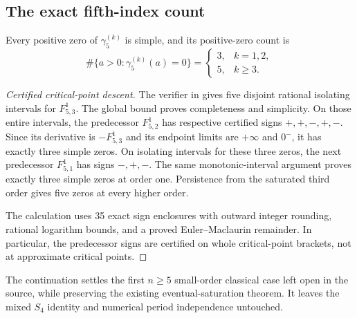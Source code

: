 \subsection{The exact fifth-index count}
\begin{theorem}\label{lerchcont:n5}
Every positive zero of $\gamma_5^{(k)}$ is simple, and its positive-zero count is
\[
 \#\{a>0:\gamma_5^{(k)}(a)=0\}=
 \begin{cases}3,&k=1,2,\\5,&k\ge3.\end{cases}
\]
\end{theorem}
\begin{proof}[Certified critical-point descent]
The verifier in \cite{lerchcont2026} gives five disjoint rational isolating
intervals for $F_{5,3}^{1}$. The global bound proves completeness and simplicity.
On those entire intervals, the predecessor $F_{5,2}^{1}$ has respective
certified signs $+,+,-,+,-$. Since its derivative is $-F_{5,3}^{1}$ and its
endpoint limits are $+\infty$ and $0^-$, it has exactly three simple zeros.
On isolating intervals for these three zeros, the next predecessor
$F_{5,1}^{1}$ has signs $-,+,-$. The same monotonic-interval argument proves
exactly three simple zeros at order one. Persistence from the saturated third
order gives five zeros at every higher order.

The calculation uses 35 exact sign enclosures with outward integer rounding,
rational logarithm bounds, and a proved Euler--Maclaurin remainder. In
particular, the predecessor signs are certified on whole critical-point
brackets, not at approximate critical points.
\end{proof}

The continuation settles the first $n\ge5$ small-order classical case left
open in the source, while preserving the existing eventual-saturation theorem.
It leaves the mixed $S_4$ identity and numerical period independence untouched.
